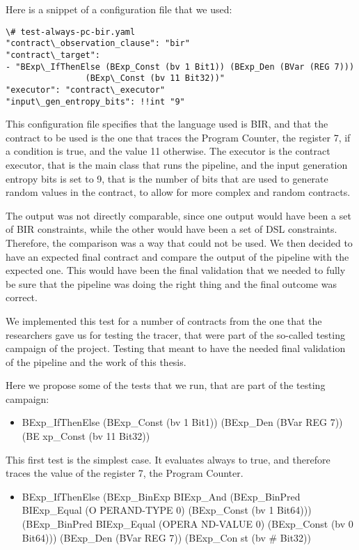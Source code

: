 Here is a snippet of a configuration file that we used:
\begin{verbatim}
\# test-always-pc-bir.yaml
"contract\_observation_clause": "bir"
"contract\_target":
- "BExp\_IfThenElse (BExp_Const (bv 1 Bit1)) (BExp_Den (BVar (REG 7))) 
                (BExp\_Const (bv 11 Bit32))"
"executor": "contract\_executor"
"input\_gen_entropy_bits": !!int "9"
\end{verbatim}

This configuration file specifies that the language used is BIR, and that the
contract to be used is the one that traces the Program Counter, the register 7,
if a condition is true, and the value 11 otherwise. The executor is the contract
executor, that is the main class that runs the pipeline, and the input
generation entropy bits is set to 9, that is the number of bits that are used to
generate random values in the contract, to allow for more complex and random
contracts.

The output was not directly comparable, since one output would have been a set of
BIR constraints, while the other would have been a set of DSL constraints. Therefore,
the comparison was a way that could not be used. We then decided to have an expected
final contract and compare the output of the pipeline with the expected one.
This would have been the final validation that we needed to fully be sure that
the pipeline was doing the right thing and the final outcome was correct.

We implemented this test for a number of contracts from the one that the
researchers gave us for testing the tracer, that were part of the so-called testing
campaign of the project. Testing that meant to have the needed final validation
of the pipeline and the work of this thesis.

Here we propose some of the tests that we run, that are part of the testing campaign:
\begin{itemize}
  \item BExp\_IfThenElse (BExp\_Const (bv 1 Bit1)) (BExp\_Den (BVar REG 7)) (BE
    xp\_Const (bv 11 Bit32))
\end{itemize}

This first test is the simplest case. It evaluates always to true, and therefore
traces the value of the register 7, the Program Counter.

\begin{itemize}
  \item BExp\_IfThenElse (BExp\_BinExp BIExp\_And (BExp\_BinPred BIExp\_Equal (O
    PERAND-TYPE 0) (BExp\_Const (bv 1 Bit64))) (BExp\_BinPred BIExp\_Equal (OPERA
    ND-VALUE 0) (BExp\_Const (bv 0 Bit64))) (BExp\_Den (BVar REG 7)) (BExp\_Con st
    (bv \# Bit32))
\end{itemize}

